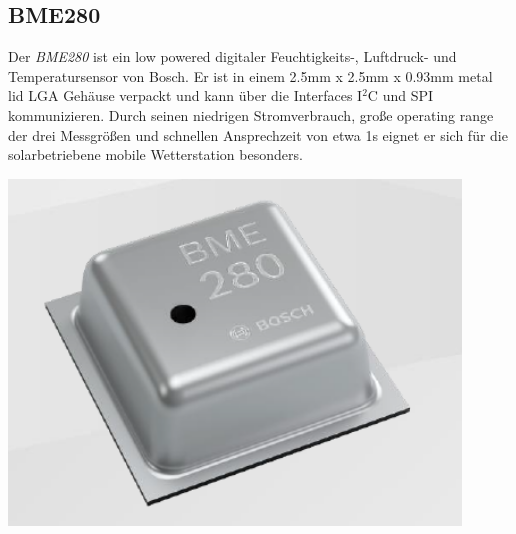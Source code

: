 \subsection{BME280}

{\begin{minipage}[b][6cm][t]{0.55\textwidth}
Der \textit{BME280} ist ein low powered digitaler Feuchtigkeits-, Luftdruck- und Temperatursensor von Bosch. Er ist in einem 2.5mm x 2.5mm x 0.93mm metal lid LGA Gehäuse verpackt und kann über die Interfaces I$^{2}$C und SPI kommunizieren. Durch seinen niedrigen Stromverbrauch, große operating range der drei Messgrößen und schnellen Ansprechzeit von etwa 1s eignet er sich für die solarbetriebene mobile Wetterstation besonders. \cite{Bosch2019}\\
\end{minipage}}
{\begin{minipage}[b][6cm][t]{0.44\textwidth}
\centering
\includegraphics[width=0.9\textwidth]{graphics/bme280/bme280.PNG}
\label{fig:bme280}
\end{minipage}}

